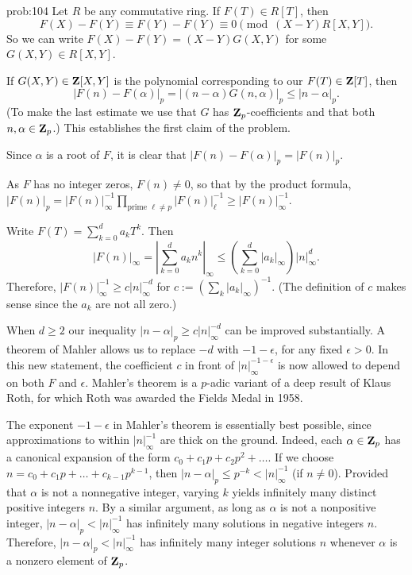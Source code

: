 \begin{sol}{prob:104} Let $R$ be any commutative ring. If $F(T) \in R[T]$, then $$F(X)-F(Y) \equiv F(Y) - F(Y) \equiv 0 \pmod{(X-Y) R[X,Y]}.$$ So we can write $F(X) - F(Y) = (X-Y) G(X,Y)$ for some $G(X,Y) \in R[X,Y]$.  

If $G(X,Y) \in \mathbf{Z}[X,Y]$ is the polynomial corresponding to our $F(T) \in \mathbf{Z}[T]$, then 
\[ |F(n)-F(\alpha)|_p = |(n-\alpha)G(n,\alpha)|_p \le |n-\alpha|_p. \] 
(To make the last estimate we use that $G$ has $\mathbf{Z}_p$-coefficients and that both $n,\alpha \in \mathbf{Z}_p$.)  This establishes the first claim of the problem.

Since $\alpha$ is a root of $F$, it is clear that $|F(n)-F(\alpha)|_p = |F(n)|_p$.

As $F$ has no integer zeros, $F(n) \ne 0$, so that by the product formula, $|F(n)|_p = |F(n)|_{\infty}^{-1} \prod_{\text{prime }\ell \ne p} |F(n)|_\ell^{-1} \ge |F(n)|_{\infty}^{-1}$.

Write $F(T) = \sum_{k=0}^{d} a_k T^k$. Then
\[ |F(n)|_{\infty} = \left|\sum_{k=0}^{d} a_k n^k\right|_{\infty} \le \left(\sum_{k=0}^{d} |a_k|_{\infty}\right) |n|_{\infty}^{d}.\]  Therefore, $|F(n)|_{\infty}^{-1} \ge c|n|_{\infty}^{-d}$ for $c := (\sum_k |a_k|_{\infty})^{-1}$. (The definition of $c$ makes sense since the $a_k$ are not all zero.) 
\end{sol}

\begin{rmk} When $d\ge 2$ our inequality $|n-\alpha|_p \ge c|n|_{\infty}^{-d}$ can be improved substantially. A theorem of Mahler \cite[Theorem (5,I), p.\ 159]{mahler61} allows us to replace $-d$ with $-1-\epsilon$, for any fixed $\epsilon > 0$. In this new statement, the coefficient $c$ in front of $|n|_{\infty}^{-1-\epsilon}$ is now allowed to depend on both $F$ and $\epsilon$. Mahler's theorem is a $p$-adic variant of a deep result of Klaus Roth, for which Roth was awarded the Fields Medal in 1958.

The exponent $-1-\epsilon$ in Mahler's theorem is  essentially best possible, since approximations to within $|n|_{\infty}^{-1}$ are thick on the ground. Indeed, each $\alpha \in \mathbf{Z}_p$ has a canonical expansion of the form $c_0 + c_1 p + c_2 p^2 + \dots$. If we choose $n=c_0 + c_1 p + \dots + c_{k-1} p^{k-1}$, then $|n-\alpha|_p \le p^{-k} < |n|_{\infty}^{-1}$ (if $n\ne 0$). Provided that $\alpha$ is not a nonnegative integer, varying $k$ yields infinitely many distinct positive integers $n$. By a similar argument, as long as $\alpha$ is not a nonpositive integer, $|n-\alpha|_p < |n|_{\infty}^{-1}$ has infinitely many solutions in negative integers $n$. Therefore, $|n-\alpha|_p < |n|_{\infty}^{-1}$ has infinitely many integer solutions $n$ whenever $\alpha$ is a nonzero element of $\mathbf{Z}_p$. 
\end{rmk}

